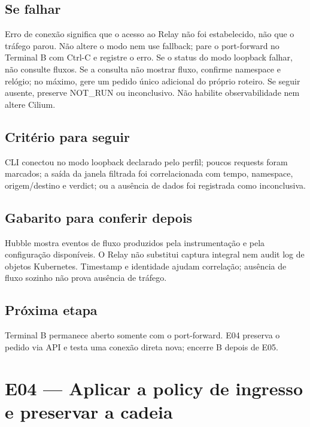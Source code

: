 \documentclass[12pt,openany,oneside,a4paper,chapter=TITLE,english,brazil]{abntex2}
\begin{document}
\section*{Se falhar}\label{se-falhar-2}

Erro de conexão significa que o acesso ao Relay não foi estabelecido, não que o tráfego parou. Não altere o modo nem use fallback; pare o port-forward no Terminal B com Ctrl-C e registre o erro. Se o status do modo loopback falhar, não consulte fluxos. Se a consulta não mostrar fluxo, confirme namespace e relógio; no máximo, gere um pedido único adicional do próprio roteiro. Se seguir ausente, preserve NOT\_RUN ou inconclusivo. Não habilite observabilidade nem altere Cilium.

\section*{Critério para seguir}\label{crituxe9rio-para-seguir-2}

CLI conectou no modo loopback declarado pelo perfil; poucos requests foram marcados; a saída da janela filtrada foi correlacionada com tempo, namespace, origem/destino e verdict; ou a ausência de dados foi registrada como inconclusiva.

\section*{Gabarito para conferir depois}\label{gabarito-para-conferir-depois-2}

Hubble mostra eventos de fluxo produzidos pela instrumentação e pela configuração disponíveis. O Relay não substitui captura integral nem audit log de objetos Kubernetes. Timestamp e identidade ajudam correlação; ausência de fluxo sozinho não prova ausência de tráfego.

\section*{Próxima etapa}\label{pruxf3xima-etapa-1}

Terminal B permanece aberto somente com o port-forward. E04 preserva o pedido via API e testa uma conexão direta nova; encerre B depois de E05.

\chapter*{E04 — Aplicar a policy de ingresso e preservar a cadeia}
\end{document}
